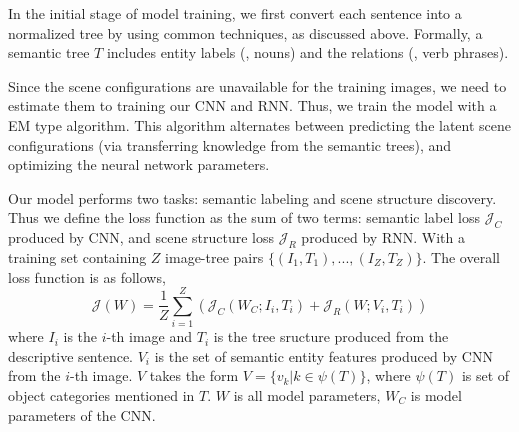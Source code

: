 \documentclass[10pt,twocolumn,letterpaper]{article}
\begin{document}
In the initial stage of model training, we first convert each sentence into a normalized tree by using common techniques, as discussed above. Formally, a semantic tree $T$ includes entity labels (\ie, nouns) and the relations (\ie, verb phrases).

Since the scene configurations are unavailable for the training images, we need to estimate them to training our CNN and RNN. Thus, we train the model with a EM type algorithm. This algorithm alternates between predicting the latent scene configurations (via transferring knowledge from the semantic trees), and optimizing the neural network parameters.

Our model performs two tasks: semantic labeling and scene structure discovery. Thus we define the loss function as the sum of two terms: semantic label loss $\mathcal{J}_{C}$ produced by CNN, and scene structure loss $\mathcal{J}_{R}$ produced by RNN. With a training set containing $Z$ image-tree pairs $\{(I_1,T_1),...,(I_Z,T_Z)\}$. The overall loss function is as follows,
\begin{equation}\label{eq_overallloss}
\mathcal{J}(W)  =  \frac{1}{Z} \sum_{i=1}^Z ( \mathcal{J}_{C}(W_C;I_i,T_i) + \mathcal{J}_{R}(W;V_i,T_i) )
\end{equation}
where $I_i$ is the $i$-th image and $T_i$ is the tree sructure produced from the descriptive sentence. $V_i$ is the set of semantic entity features produced by CNN from the $i$-th image. $V$ takes the form $V=\{v_k|k\in \psi(T)\}$, where $\psi(T)$ is set of object categories mentioned in $T$. $W$ is all model parameters, $W_C$ is model parameters of the CNN.

\end{document}
